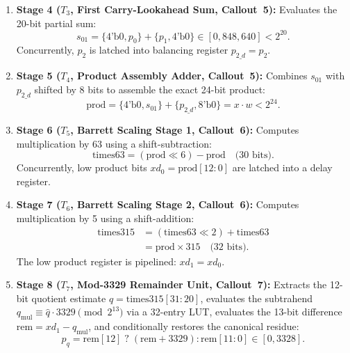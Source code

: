 \begin{enumerate}
    \item \textbf{Stage 4 ($T_3$, First Carry-Lookahead Sum, Callout~5):} Evaluates the 20-bit partial sum:
    \begin{equation}
    \label{eq:s01_eval}
    s_{01} = \{4\text{'b0}, p_0\} + \{p_1, 4\text{'b0}\} \in [0, 848,640] < 2^{20}.
    \end{equation}
    Concurrently, $p_2$ is latched into balancing register $p_{2\_d} = p_2$.

    \item \textbf{Stage 5 ($T_4$, Product Assembly Adder, Callout~5):} Combines $s_{01}$ with $p_{2\_d}$ shifted by 8 bits to assemble the exact 24-bit product:
    \begin{equation}
    \label{eq:prod_assembly}
    \text{prod} = \{4\text{'b0}, s_{01}\} + \{p_{2\_d}, 8\text{'b0}\} = x \cdot w < 2^{24}.
    \end{equation}

    \item \textbf{Stage 6 ($T_5$, Barrett Scaling Stage 1, Callout~6):} Computes multiplication by 63 using a shift-subtraction:
    \begin{equation}
    \label{eq:times63_calc}
    \text{times63} = (\text{prod} \ll 6) - \text{prod} \quad \text{(30 bits)}.
    \end{equation}
    Concurrently, low product bits $xd_0 = \text{prod}[12:0]$ are latched into a delay register.

    \item \textbf{Stage 7 ($T_6$, Barrett Scaling Stage 2, Callout~6):} Computes multiplication by 5 using a shift-addition:
    \begin{equation}
    \label{eq:times315_calc}
    \begin{aligned}
    \text{times315} &= (\text{times63} \ll 2) + \text{times63} \\
    &= \text{prod} \times 315 \quad \text{(32 bits)}.
    \end{aligned}
    \end{equation}
    The low product register is pipelined: $xd_1 = xd_0$.

    \item \textbf{Stage 8 ($T_7$, Mod-3329 Remainder Unit, Callout~7):} Extracts the 12-bit quotient estimate $\hat{q} = \text{times315}[31:20]$, evaluates the subtrahend $q_{\text{mul}} \equiv \hat{q} \cdot 3329 \pmod{2^{13}}$ via a 32-entry LUT, evaluates the 13-bit difference $\text{rem} = xd_1 - q_{\text{mul}}$, and conditionally restores the canonical residue:
    \begin{equation}
    \label{eq:pq_calc}
    p_q = \text{rem}[12] \; ? \; (\text{rem} + 3329) : \text{rem}[11:0] \in [0, 3328].
    \end{equation}


\end{enumerate}
